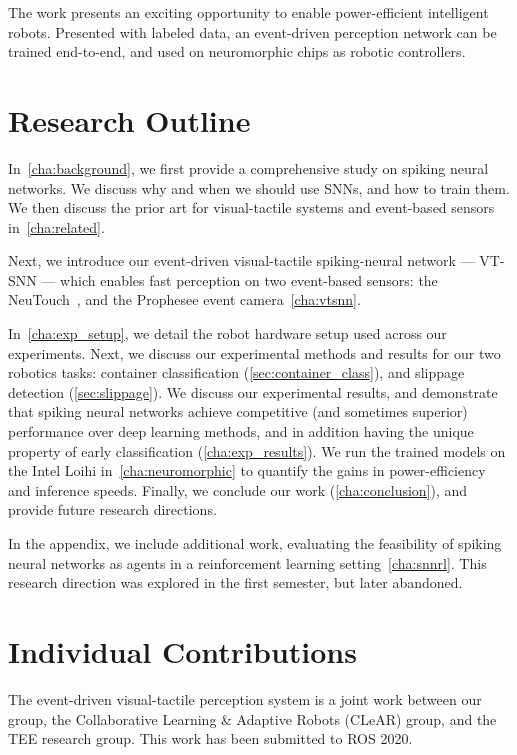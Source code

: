 \documentclass[fyp]{socreport}
\begin{document}
The work presents an exciting opportunity to enable power-efficient intelligent
robots. Presented with labeled data, an event-driven perception network can be
trained end-to-end, and used on neuromorphic chips as robotic controllers.

\section{Research Outline}

In~\autoref{cha:background}, we first provide a comprehensive study on spiking
neural networks. We discuss why and when we should use SNNs, and how to train
them. We then discuss the prior art for visual-tactile systems and event-based
sensors in~\autoref{cha:related}.

Next, we introduce our event-driven visual-tactile spiking-neural network
--- VT-SNN --- which enables fast perception on two event-based sensors: the
NeuTouch~\cite{aiskinLee}, and the Prophesee event camera~\autoref{cha:vtsnn}.

In~\autoref{cha:exp_setup}, we detail the robot hardware setup used across our
experiments. Next, we discuss our experimental methods and results for our two
robotics tasks: container classification (\autoref{sec:container_class}), and
slippage detection (\autoref{sec:slippage}). We discuss our experimental
results, and demonstrate that spiking neural networks achieve competitive (and
sometimes superior) performance over deep learning methods, and in addition
having the unique property of early classification (\autoref{cha:exp_results}).
We run the trained models on the Intel Loihi in~\autoref{cha:neuromorphic} to
quantify the gains in power-efficiency and inference speeds. Finally, we
conclude our work (\autoref{cha:conclusion}), and provide future research
directions.

In the appendix, we include additional work, evaluating the feasibility of
spiking neural networks as agents in a reinforcement learning
setting~\autoref{cha:snnrl}. This research direction was explored in the first
semester, but later abandoned.

\section{Individual Contributions}
The event-driven visual-tactile perception system is a joint work between our
group, the Collaborative Learning \& Adaptive Robots (CLeAR) group, and the TEE
research group. This work has been submitted to ROS 2020.
\end{document}
